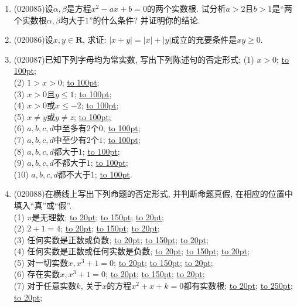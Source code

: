 \documentclass[10pt,a4paper]{article}
\newcommand{\blank}[1]{\underline{\hbox to #1pt{}}}
\newcommand{\bracket}[1]{(\hbox to #1pt{})}
\newcommand{\fourch}[4]{\par\begin{tabular}{p{.23\textwidth}p{.23\textwidth}p{.23\textwidth}p{.23\textwidth}}
A.~#1 &B.~#2& C.~#3& D.~#4
\end{tabular}}
\begin{document}
\begin{enumerate}[1.]
\textcircled{1} $A\cap B=\varnothing$的一个充要条件是$\mathrm{card}(A\cup B)=\mathrm{card}(A)+\mathrm{card}(B)$;\\
\textcircled{2} $A\subseteq B$的一个必要不充分条件是$\mathrm{card}(A)\le \mathrm{card}(B)$; \\
\textcircled{3} $A$不是$B$的子集的一个充分不必要条件是$\mathrm{card}(A)>\mathrm{card}(B)$;\\ 
\textcircled{4} $A=B$的一个充要条件是$\mathrm{card}(A)=\mathrm{card}(B)$.\\ 
其中真命题的个数是\bracket{20}.
\fourch{$0$}{$1$}{$2$}{$3$}
\item {\tiny (020085)}设$\alpha,\beta$是方程$x^2-ax+b=0$的两个实数根. 试分析$a>2$且$b>1$是``两个实数根$\alpha,\beta$均大于$1$''的什么条件? 并证明你的结论.
\item {\tiny (020086)}设$x,y\in \mathbf{R}$, 求证: $|x+y|=|x|+|y|$成立的充要条件是$xy\ge 0$.
\item {\tiny (020087)}已知下列字母均为常实数, 写出下列陈述句的否定形式;
(1) $x>0$; \blank{100};\\
(2) $1>x>0$; \blank{100};\\
(3) $x>0$且$y\le 1$; \blank{100};\\
(4) $x>0$或$x\le -2$; \blank{100};\\
(5) $x\ne y$或$y\ne z$; \blank{100};\\
(6) $a,b,c,d$中至多有$2$个$0$; \blank{100};\\
(7) $a,b,c,d$中至少有$2$个$1$; \blank{100};\\
(8) $a,b,c,d$都大于$1$; \blank{100};\\
(9) $a,b,c,d$不都大于$1$; \blank{100};\\
(10) $a,b,c,d$都不大于$1$; \blank{100}.
\item {\tiny (020088)}在横线上写出下列命题的否定形式, 并判断命题真假, 在相应的位置中填入``真''或``假''.\\
(1) $\pi$是无理数; \blank{20}; \blank{150}; \blank{20};\\
(2) $2+1=4$;  \blank{20}; \blank{150}; \blank{20};\\
(3) 任何实数是正数或负数;  \blank{20}; \blank{150}; \blank{20};\\
(4) 任何实数是正数或任何实数是负数;  \blank{20}; \blank{150}; \blank{20};\\
(5) 对一切实数$x, x^3+1=0$;  \blank{20}; \blank{150}; \blank{20};\\
(6) 存在实数$x, x^3+1=0$;  \blank{20}; \blank{150}; \blank{20};\\
(7) 对于任意实数$k$, 关于$x$的方程$x^2+x+k=0$都有实数根;  \blank{20}; \blank{250}; \blank{20};\\

\end{enumerate}
\end{document}
